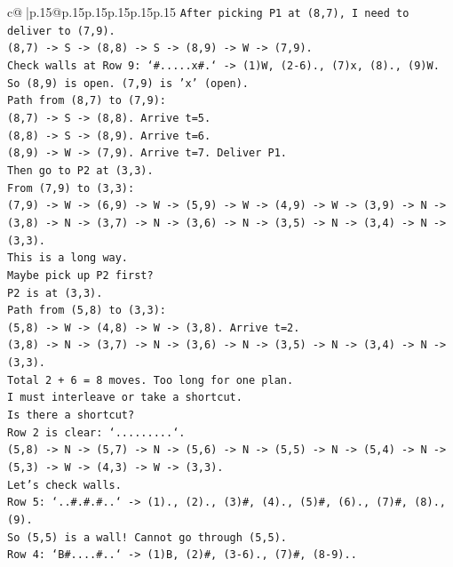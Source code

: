 \documentclass{article}
\begin{document}
{\begin{supertabular}{c@{$\;$}|p{.15\linewidth}@{}p{.15\linewidth}p{.15\linewidth}p{.15\linewidth}p{.15\linewidth}p{.15\linewidth}}
{{{\texttt{After picking P1 at (8,7), I need to deliver to (7,9).} \\
\texttt{(8,7) {-}> S {-}> (8,8) {-}> S {-}> (8,9) {-}> W {-}> (7,9).} \\
\texttt{Check walls at Row 9: `\#.....x\#.` {-}> (1)W, (2{-}6)., (7)x, (8)., (9)W.} \\
\texttt{So (8,9) is open. (7,9) is 'x' (open).} \\
\texttt{Path from (8,7) to (7,9):} \\
\texttt{(8,7) {-}> S {-}> (8,8). Arrive t=5.} \\
\texttt{(8,8) {-}> S {-}> (8,9). Arrive t=6.} \\
\texttt{(8,9) {-}> W {-}> (7,9). Arrive t=7. Deliver P1.} \\
\texttt{Then go to P2 at (3,3).} \\
\texttt{From (7,9) to (3,3):} \\
\texttt{(7,9) {-}> W {-}> (6,9) {-}> W {-}> (5,9) {-}> W {-}> (4,9) {-}> W {-}> (3,9) {-}> N {-}> (3,8) {-}> N {-}> (3,7) {-}> N {-}> (3,6) {-}> N {-}> (3,5) {-}> N {-}> (3,4) {-}> N {-}> (3,3).} \\
\texttt{This is a long way.} \\
\texttt{Maybe pick up P2 first?} \\
\texttt{P2 is at (3,3).} \\
\texttt{Path from (5,8) to (3,3):} \\
\texttt{(5,8) {-}> W {-}> (4,8) {-}> W {-}> (3,8). Arrive t=2.} \\
\texttt{(3,8) {-}> N {-}> (3,7) {-}> N {-}> (3,6) {-}> N {-}> (3,5) {-}> N {-}> (3,4) {-}> N {-}> (3,3).} \\
\texttt{Total 2 + 6 = 8 moves. Too long for one plan.} \\
\texttt{I must interleave or take a shortcut.} \\
\texttt{Is there a shortcut?} \\
\texttt{Row 2 is clear: `.........`.} \\
\texttt{(5,8) {-}> N {-}> (5,7) {-}> N {-}> (5,6) {-}> N {-}> (5,5) {-}> N {-}> (5,4) {-}> N {-}> (5,3) {-}> W {-}> (4,3) {-}> W {-}> (3,3).} \\
\texttt{Let's check walls.} \\
\texttt{Row 5: `..\#.\#.\#..` {-}> (1)., (2)., (3)\#, (4)., (5)\#, (6)., (7)\#, (8)., (9).} \\
\texttt{So (5,5) is a wall! Cannot go through (5,5).} \\
\texttt{Row 4: `B\#....\#..` {-}> (1)B, (2)\#, (3{-}6)., (7)\#, (8{-}9)..} \\
}}}
\end{supertabular}}
\end{document}
